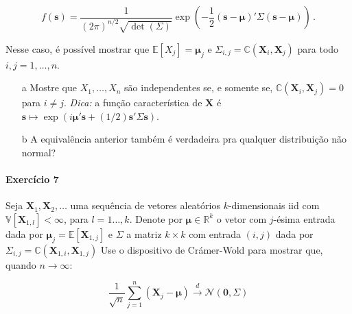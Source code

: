 \documentclass[10pt,a4paper]{article}
\begin{document}
$$f(\boldsymbol{s}) =\frac{1}{(2\pi)^{n/2} \sqrt{\operatorname{det}(\Sigma)}}\exp\left(-\frac{1}{2}(\boldsymbol{s}-\boldsymbol{\mu})'\Sigma (\boldsymbol{s}-\boldsymbol{\mu})\right)\, .$$

Nesse caso, é possível mostrar que $\mathbb{E}[X_j] =\boldsymbol{\mu}_j$ e $\Sigma_{i,j} = \mathbb{C}(\boldsymbol{X}_i,\boldsymbol{X}_j)$ para todo $i,j=1,\ldots, n$.
\begin{itemize}
	\item[a] Mostre que $X_1,\ldots,X_n$ são independentes se, e somente se, $ \mathbb{C}(\boldsymbol{X}_i,\boldsymbol{X}_j) = 0$ para $i\neq j$. \textit{Dica:} a função característica de $\boldsymbol{X}$ é  $\boldsymbol{s}\mapsto \exp(i\boldsymbol{\mu}'\boldsymbol{s} + (1/2)\boldsymbol{s}'\Sigma \boldsymbol{s})$.
	\item[b] A equivalência anterior também é verdadeira pra qualquer distribuição não normal?  
\end{itemize}

\paragraph{Exercício 7} Seja $\boldsymbol{X}_1,\boldsymbol{X}_2,\ldots$ uma sequência de vetores aleatórios $k$-dimensionais iid com $\mathbb{V}[\boldsymbol{X}_{1,l}]<\infty$, para $l=1\ldots, k$. Denote por $\boldsymbol{\mu} \in \mathbb{R}^k$ o vetor com $j$-ésima entrada dada por $\boldsymbol{\mu}_j = \mathbb{E}[\boldsymbol{X}_{1,j}]$ e $\Sigma$ a matriz $k\times k$ com entrada $(i,j)$ dada por $\Sigma_{i,j} = \mathbb{C}(\boldsymbol{X}_{1,i},\boldsymbol{X}_{1,j})$ Use o dispositivo de Crámer-Wold para mostrar que, quando $n \to \infty$:

$$\frac{1}{\sqrt{n}}\sum_{j=1}^n(\boldsymbol{X}_j -\boldsymbol{\mu})\overset{d}{\to}\mathcal{N}(\boldsymbol{0},\Sigma)$$
\end{document}
